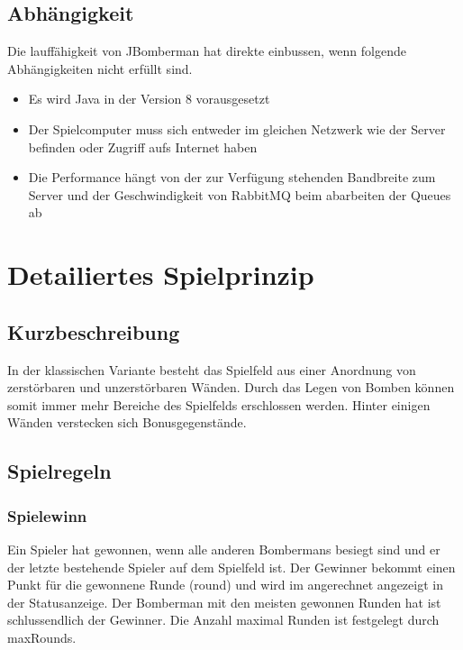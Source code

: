 \documentclass[11pt]{scrartcl}
\begin{document}
\subsection{Abhängigkeit}
\label{sec:Abhängigkeit}
Die lauffähigkeit von JBomberman hat direkte einbussen, wenn 
folgende Abhängigkeiten nicht erfüllt sind.
\begin{itemize}
    \item Es wird Java in der Version 8 vorausgesetzt
    \item Der Spielcomputer muss sich entweder im gleichen Netzwerk 
    wie der Server befinden oder Zugriff aufs Internet haben
    \item Die Performance hängt von der zur Verfügung stehenden 
    Bandbreite zum Server und der Geschwindigkeit von RabbitMQ 
    beim abarbeiten der Queues ab
\end{itemize}

\newpage
\section{Detailiertes Spielprinzip}
\label{sec:Detailiertes Spielprinzip}
\subsection{Kurzbeschreibung}
\label{Kurzbeschreibung}
In der klassischen Variante besteht das Spielfeld aus einer Anordnung 
von zerstörbaren und unzerstörbaren Wänden. 
Durch das Legen von Bomben können somit immer mehr 
Bereiche des Spielfelds erschlossen werden. Hinter einigen 
Wänden verstecken sich Bonusgegenstände.\cite{Bomberman Spielprinzip}

\subsection{Spielregeln}
\label{sec:Spielregeln}

\subsubsection{Spielewinn}
\label{sec:Spielgewinn}
Ein Spieler hat gewonnen, wenn alle anderen Bombermans besiegt sind und er der 
letzte bestehende Spieler auf dem Spielfeld ist.
Der Gewinner bekommt einen Punkt für die gewonnene Runde (round) 
und wird im angerechnet angezeigt in der Statusanzeige.
Der Bomberman mit den meisten gewonnen Runden hat ist schlussendlich der Gewinner.
Die Anzahl maximal Runden ist festgelegt durch maxRounds.
\end{document}
